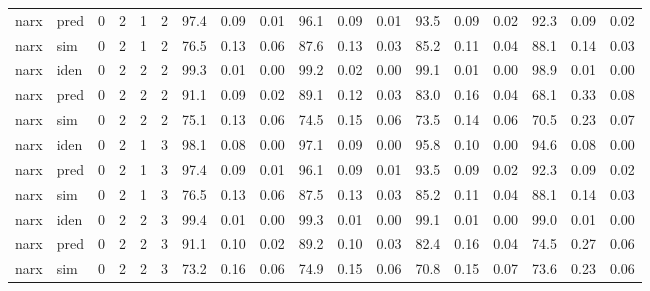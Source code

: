 \begin{landscape}
\begin{center}
\begin{longtable}{ll|cccc|ccc|ccc|ccc|ccc}
narx & pred & 0 & 2 & 1 & 2 & 97.4 & 0.09 & 0.01 & 96.1 & 0.09 & 0.01 & 93.5 & 0.09 & 0.02 & 92.3 & 0.09 & 0.02 \\ 
narx & sim  & 0 & 2 & 1 & 2 & 76.5 & 0.13 & 0.06 & 87.6 & 0.13 & 0.03 & 85.2 & 0.11 & 0.04 & 88.1 & 0.14 & 0.03 \\ 
 \hline 
narx & iden & 0 & 2 & 2 & 2 & 99.3 & 0.01 & 0.00 & 99.2 & 0.02 & 0.00 & 99.1 & 0.01 & 0.00 & 98.9 & 0.01 & 0.00 \\ 
narx & pred & 0 & 2 & 2 & 2 & 91.1 & 0.09 & 0.02 & 89.1 & 0.12 & 0.03 & 83.0 & 0.16 & 0.04 & 68.1 & 0.33 & 0.08 \\ 
narx & sim  & 0 & 2 & 2 & 2 & 75.1 & 0.13 & 0.06 & 74.5 & 0.15 & 0.06 & 73.5 & 0.14 & 0.06 & 70.5 & 0.23 & 0.07 \\ 
 \hline 
narx & iden & 0 & 2 & 1 & 3 & 98.1 & 0.08 & 0.00 & 97.1 & 0.09 & 0.00 & 95.8 & 0.10 & 0.00 & 94.6 & 0.08 & 0.00 \\ 
narx & pred & 0 & 2 & 1 & 3 & 97.4 & 0.09 & 0.01 & 96.1 & 0.09 & 0.01 & 93.5 & 0.09 & 0.02 & 92.3 & 0.09 & 0.02 \\ 
narx & sim  & 0 & 2 & 1 & 3 & 76.5 & 0.13 & 0.06 & 87.5 & 0.13 & 0.03 & 85.2 & 0.11 & 0.04 & 88.1 & 0.14 & 0.03 \\ 
 \hline 
narx & iden & 0 & 2 & 2 & 3 & 99.4 & 0.01 & 0.00 & 99.3 & 0.01 & 0.00 & 99.1 & 0.01 & 0.00 & 99.0 & 0.01 & 0.00 \\ 
narx & pred & 0 & 2 & 2 & 3 & 91.1 & 0.10 & 0.02 & 89.2 & 0.10 & 0.03 & 82.4 & 0.16 & 0.04 & 74.5 & 0.27 & 0.06 \\ 
narx & sim  & 0 & 2 & 2 & 3 & 73.2 & 0.16 & 0.06 & 74.9 & 0.15 & 0.06 & 70.8 & 0.15 & 0.07 & 73.6 & 0.23 & 0.06 \\ 
 \hline 
\end{longtable} 
\normalsize \end{center} 
 \end{landscape}